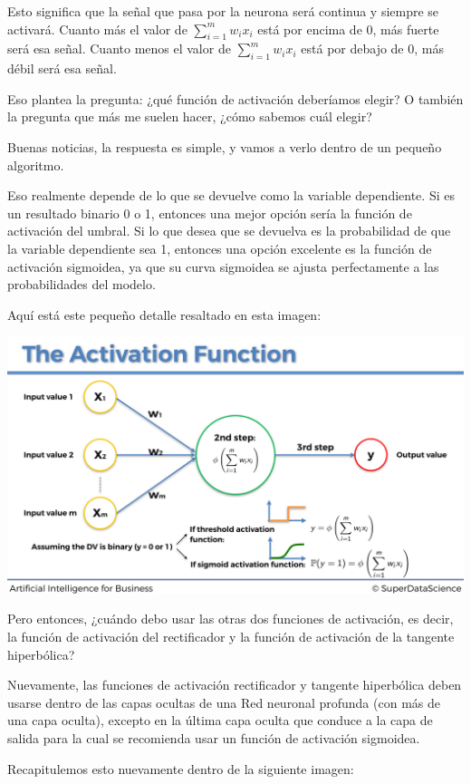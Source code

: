 \documentclass[
]{book}
\begin{document}
Esto significa que la señal que pasa por la neurona será continua y siempre se activará. Cuanto más el valor de \(\sum_{i = 1}^m w_i x_i\) está por encima de 0, más fuerte será esa señal. Cuanto menos el valor de \(\sum_{i = 1}^m w_i x_i\) está por debajo de 0, más débil será esa señal.

Eso plantea la pregunta: ¿qué función de activación deberíamos elegir? O también la pregunta que más me suelen hacer, ¿cómo sabemos cuál elegir?

Buenas noticias, la respuesta es simple, y vamos a verlo dentro de un pequeño algoritmo.

Eso realmente depende de lo que se devuelve como la variable dependiente. Si es un resultado binario 0 o 1, entonces una mejor opción sería la función de activación del umbral. Si lo que desea que se devuelva es la probabilidad de que la variable dependiente sea 1, entonces una opción excelente es la función de activación sigmoidea, ya que su curva sigmoidea se ajusta perfectamente a las probabilidades del modelo.

Aquí está este pequeño detalle resaltado en esta imagen:

\includegraphics{Images/ANN_14.png}

Pero entonces, ¿cuándo debo usar las otras dos funciones de activación, es decir, la función de activación del rectificador y la función de activación de la tangente hiperbólica?

Nuevamente, las funciones de activación rectificador y tangente hiperbólica deben usarse dentro de las capas ocultas de una Red neuronal profunda (con más de una capa oculta), excepto en la última capa oculta que conduce a la capa de salida para la cual se recomienda usar un función de activación sigmoidea.

Recapitulemos esto nuevamente dentro de la siguiente imagen:
\end{document}
